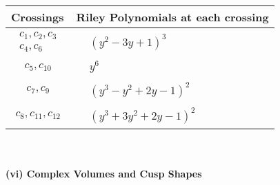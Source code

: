 \documentclass[1p]{elsarticle_modified}
\theoremstyle{definition}
\begin{document}
\begin{tabular}{m{50pt}|m{274pt}}
Crossings & \hspace{64pt}Riley Polynomials at each crossing \\
\hline $$\begin{aligned}c_{1},c_{2},c_{3}\\c_{4},c_{6}\end{aligned}$$&$\begin{aligned}
&(y^2-3 y+1)^3
\end{aligned}$\\
\hline $$\begin{aligned}c_{5},c_{10}\end{aligned}$$&$\begin{aligned}
&y^6
\end{aligned}$\\
\hline $$\begin{aligned}c_{7},c_{9}\end{aligned}$$&$\begin{aligned}
&(y^3- y^2+2 y-1)^2
\end{aligned}$\\
\hline $$\begin{aligned}c_{8},c_{11},c_{12}\end{aligned}$$&$\begin{aligned}
&(y^3+3 y^2+2 y-1)^2
\end{aligned}$\\
\hline
\end{tabular}\\~\\
\newpage\flushleft \textbf{(vi) Complex Volumes and Cusp Shapes}
\end{document}
